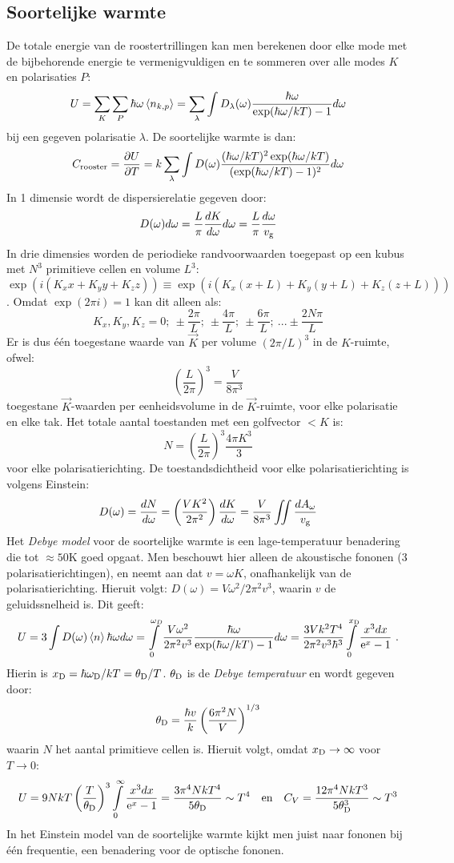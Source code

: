 \subsection{Soortelijke warmte}
De totale energie van de roostertrillingen kan men berekenen door elke mode
met de bijbehorende energie te vermenigvuldigen en te sommeren over alle
modes $K$ en polarisaties $P$:
\[
U=\sum\limits_{K}\sum\limits_{P}\hbar\omega\left\langle n_{k,p} \right\rangle=
\sum\limits_{\lambda}\int D_{\lambda}(\omega)\frac{\hbar\omega}{\exp(\hbar\omega/kT)-1}d\omega
\]
bij een gegeven polarisatie $\lambda$. De soortelijke warmte is dan:
\[
C_{\rm rooster}=\frac{\partial U}{\partial T}=k\sum\limits_{\lambda}\int D(\omega)
\frac{(\hbar\omega/kT)^2\exp(\hbar\omega/kT)}{(\exp(\hbar\omega/kT)-1)^2} d\omega
\]
In 1 dimensie wordt de dispersierelatie gegeven door:
\[
D(\omega)d\omega =\frac{L}{\pi}\frac{dK}{d\omega}d\omega=\frac{L}{\pi}\frac{d\omega}{v_{\rm g}}
\]
In drie dimensies worden de periodieke randvoorwaarden toegepast op een kubus
met $N^3$ primitieve cellen en volume $L^3$:
$\exp(i(K_x x+K_y y +K_z z))\equiv\exp(i(K_x(x+L)+K_y(y+L)+K_z(z+L)))$.
\npar
Omdat $\exp(2\pi i)=1$ kan dit alleen als:
\[
K_x,K_y,K_z = 0;~\pm\frac{2\pi}{L};~\pm\frac{4\pi}{L};~\pm\frac{6\pi}{L};~...\pm\frac{2N\pi}{L}
\]
Er is dus \'e\'en toegestane waarde van $\vec{K}$ per volume $(2\pi/L)^3$
in de $K$-ruimte, ofwel:
\[
\left(\frac{L}{2\pi}\right)^3 =\frac{V}{8\pi^3}
\]
toegestane $\vec{K}$-waarden per eenheidsvolume in de $\vec{K}$-ruimte, voor
elke polarisatie en elke tak. Het totale aantal toestanden met een golfvector
$<K$ is:
\[
N=\left(\frac{L}{2\pi}\right)^3\frac{4\pi K^3}{3}
\]
voor elke polarisatierichting. De toestandsdichtheid voor elke
polarisatierichting is volgens Einstein:
\[
D(\omega)=\frac{dN}{d\omega}=\left(\frac{VK^2}{2\pi^2}\right)
\frac{dK}{d\omega}=\frac{V}{8\pi^3}\int\hspace*{-2mm}\int\frac{dA_{\omega}}{v_{\rm g}}
\]
Het {\it Debye model} voor de soortelijke warmte is een lage-temperatuur
benadering die tot $\approx50$K goed opgaat. Men beschouwt hier alleen
de akoustische fononen (3 polarisatierichtingen), en neemt aan dat
$v=\omega K$, onafhankelijk van de polarisatierichting. Hieruit volgt:
$D(\omega)=V\omega^2/2\pi^2v^3$, waarin $v$ de geluidssnelheid is. Dit geeft:
\[
U=3\int D(\omega)\left\langle n \right\rangle\hbar\omega d\omega=
\int\limits_0^{\omega_D}\frac{V\omega^2}{2\pi^2v^3}\frac{\hbar\omega}{\exp(\hbar\omega/kT)-1}d\omega=
\frac{3Vk^2T^4}{2\pi^2v^3\hbar^3}\int\limits_0^{x_{\rm D}}\frac{x^3dx}{{\rm e}^x-1}~.
\]
Hierin is $x_{\rm D}=\hbar\omega_{\rm D}/kT=\theta_{\rm D}/T$.
$\theta_{\rm D}$ is de {\it Debye temperatuur} en wordt gegeven door:
\[
\theta_{\rm D}=\frac{\hbar v}{k}\left(\frac{6\pi^2N}{V}\right)^{1/3}
\]
waarin $N$ het aantal primitieve cellen is. Hieruit volgt, omdat
$x_{\rm D}\rightarrow\infty$ voor $T\rightarrow0$:
\[
U=9NkT\left(\frac{T}{\theta_{\rm D}}\right)^3\int\limits_0^{\infty}\frac{x^3dx}{{\rm e}^x-1}=
\frac{3\pi^4NkT^4}{5\theta_{\rm D}}\sim T^4~~~\mbox{en}~~~
C_V=\frac{12\pi^4NkT^3}{5\theta_{\rm D}^3}\sim T^3
\]
In het Einstein model van de soortelijke warmte kijkt men juist naar fononen
bij \'e\'en frequentie, een benadering voor de optische fononen.

